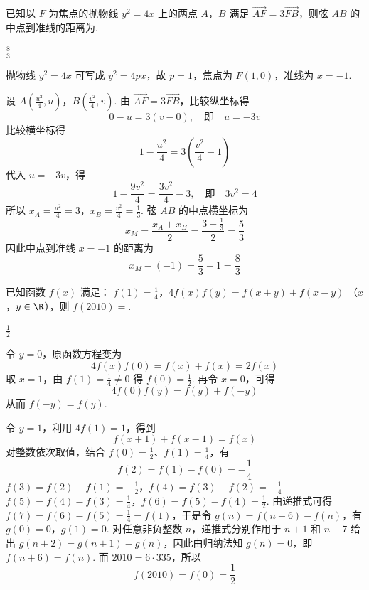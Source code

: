 \begin{problem}
已知以 \(F\) 为焦点的抛物线 \(y^{2} = 4x\) 上的两点 \(A\)，\(B\) 满足 \(\overrightarrow{AF} = 3\overrightarrow{FB}\)，则弦 \(AB\) 的中点到准线的距离为\fillinblank{}.

\begin{answer}
\(\frac{8}{3}\)
\end{answer}

\begin{solution}
抛物线 \(y^2=4x\) 可写成 \(y^2=4px\)，故 \(p=1\)，焦点为 \(F(1,0)\)，准线为 \(x=-1\).

设 \(A\left(\frac{u^2}{4},u\right)\)，\(B\left(\frac{v^2}{4},v\right)\). 由 \(\overrightarrow{AF}=3\overrightarrow{FB}\)，比较纵坐标得
\[
0-u=3(v-0),
\quad\text{即}\quad u=-3v
\]
比较横坐标得
\[
1-\frac{u^2}{4}=3\left(\frac{v^2}{4}-1\right)
\]
代入 \(u=-3v\)，得
\[
1-\frac{9v^2}{4}=\frac{3v^2}{4}-3,
\quad\text{即}\quad 3v^2=4
\]
所以 \(x_A=\frac{u^2}{4}=3\)，\(x_B=\frac{v^2}{4}=\frac13\). 弦 \(AB\) 的中点横坐标为
\[
x_M=\frac{x_A+x_B}{2}=\frac{3+\frac13}{2}=\frac53
\]
因此中点到准线 \(x=-1\) 的距离为
\[
x_M-(-1)=\frac53+1=\frac83
\]
\end{solution}
\end{problem}

\begin{problem}
已知函数 \( f(x) \) 满足： \(f(1) = \frac{1}{4}\)，\(4f(x)f(y) = f(x + y) + f(x - y)\) （\(x\)，\(y \in \R\)），则 \( f(2010) = \)\fillinblank{}.

\begin{answer}
\(\frac{1}{2}\)
\end{answer}

\begin{solution}
令 \(y=0\)，原函数方程变为
\[
4f(x)f(0)=f(x)+f(x)=2f(x)
\]
取 \(x=1\)，由 \(f(1)=\frac14\ne0\) 得 \(f(0)=\frac12\). 再令 \(x=0\)，可得
\[
4f(0)f(y)=f(y)+f(-y)
\]
从而 \(f(-y)=f(y)\).

令 \(y=1\)，利用 \(4f(1)=1\)，得到
\[
f(x+1)+f(x-1)=f(x)
\]
对整数依次取值，结合 \(f(0)=\frac12\)、\(f(1)=\frac14\)，有
\[
f(2)=f(1)-f(0)=-\frac14
\]
\(f(3)=f(2)-f(1)=-\frac12\)，\(f(4)=f(3)-f(2)=-\frac14\)
\(f(5)=f(4)-f(3)=\frac14\)，\(f(6)=f(5)-f(4)=\frac12\).
由递推式可得 \(f(7)=f(6)-f(5)=\frac14=f(1)\)，于是令 \(g(n)=f(n+6)-f(n)\)，有 \(g(0)=0\)，\(g(1)=0\). 对任意非负整数 \(n\)，递推式分别作用于 \(n+1\) 和 \(n+7\) 给出 \(g(n+2)=g(n+1)-g(n)\)，因此由归纳法知 \(g(n)=0\)，即 \(f(n+6)=f(n)\). 而 \(2010=6\cdot335\)，所以
\[
f(2010)=f(0)=\frac12
\]
\end{solution}
\end{problem}

